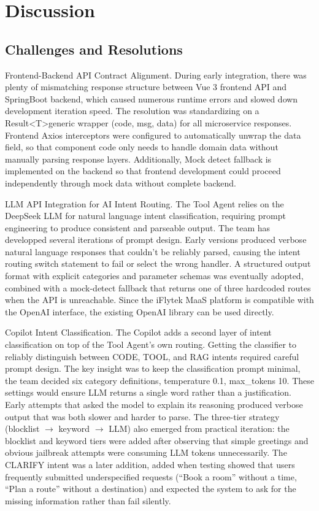 \section{Discussion}

\subsection{Challenges and Resolutions}

Frontend-Backend API Contract Alignment. During early integration, there was plenty of mismatching response structure between Vue 3 frontend API and SpringBoot backend, which caused numerous runtime errors and slowed down development iteration speed. The resolution was standardizing on a Result\textless T\textgreater generic wrapper (code, msg, data) for all microservice responses. Frontend Axios interceptors were configured to automatically unwrap the data field, so that component code only needs to handle domain data without manually parsing response layers. Additionally, Mock detect fallback is implemented on the backend so that frontend development could proceed independently through mock data without complete backend.

LLM API Integration for AI Intent Routing. The Tool Agent relies on the DeepSeek LLM for natural language intent classification, requiring prompt engineering to produce consistent and parseable output. The team has developped several iterations of prompt design. Early versions produced verbose natural language responses that couldn't be reliably parsed, causing the intent routing switch statement to fail or select the wrong handler. A structured output format with explicit categories and parameter schemas was eventually adopted, combined with a mock-detect fallback that returns one of three hardcoded routes when the API is unreachable. Since the iFlytek MaaS platform is compatible with the OpenAI interface, the existing OpenAI library can be used directly.

Copilot Intent Classification. The Copilot adds a second layer of intent classification on top of the Tool Agent's own routing. Getting the classifier to reliably distinguish between CODE, TOOL, and RAG intents required careful prompt design. The key insight was to keep the classification prompt minimal, the team decided six category definitions, temperature 0.1, max\_tokens 10. These settings would ensure LLM returns a single word rather than a justification. Early attempts that asked the model to explain its reasoning produced verbose output that was both slower and harder to parse. The three-tier strategy (blocklist $\rightarrow$ keyword $\rightarrow$ LLM) also emerged from practical iteration: the blocklist and keyword tiers were added after observing that simple greetings and obvious jailbreak attempts were consuming LLM tokens unnecessarily. The CLARIFY intent was a later addition, added when testing showed that users frequently submitted underspecified requests (``Book a room'' without a time, ``Plan a route'' without a destination) and expected the system to ask for the missing information rather than fail silently.

